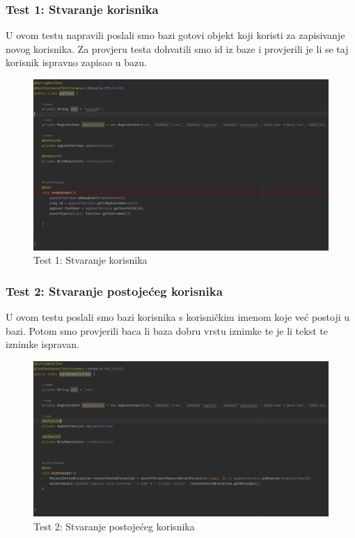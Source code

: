 				\subsubsection{Test 1: Stvaranje korisnika}
			
				U ovom testu napravili poslali smo bazi gotovi objekt koji koristi za zapisivanje novog korisnika. Za provjeru testa dohvatili smo id iz baze i provjerili je li se taj korisnik ispravno zapisao u bazu.
				
				\begin{figure}[H]
					\centering
					\includegraphics[width=12cm]{slike/stvaranjeKorisnika}
					\caption{Test 1: Stvaranje korisnika}
					\label{fig:Test-1}
				\end{figure}
			
				\subsubsection{Test 2: Stvaranje postojećeg korisnika}
				
				U ovom testu poslali smo bazi korisnika s korisničkim imenom koje već postoji u bazi. Potom smo provjerili baca li baza dobru vrstu iznimke te je li tekst te iznimke ispravan.
				
				\begin{figure}[H]
					\centering
					\includegraphics[width=12cm]{slike/stvaranjePostojecegKorisnika}
					\caption{Test 2: Stvaranje postojećeg korisnika}
					\label{fig:Test-2}
				\end{figure}
			
